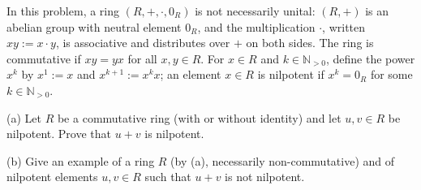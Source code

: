 \begin{problem}
    In this problem, a ring \( \left(R, +, \cdot, 0_R\right) \) is not necessarily unital: \( \left(R, +\right) \) is an abelian group with neutral element \( 0_R \), and the multiplication \( \cdot \), written \( xy := x \cdot y \), is associative and distributes over \( + \) on both sides. The ring is commutative if \( xy = yx \) for all \( x, y \in R \). For \( x \in R \) and \( k \in \mathbb{N}_{>0} \), define the power \( x^{k} \) by \( x^{1} := x \) and \( x^{k+1} := x^{k} x \); an element \( x \in R \) is nilpotent if \( x^{k} = 0_R \) for some \( k \in \mathbb{N}_{>0} \).

    (a) Let \( R \) be a commutative ring (with or without identity) and let \( u, v \in R \) be nilpotent. Prove that \( u + v \) is nilpotent.

    (b) Give an example of a ring \( R \) (by (a), necessarily non-commutative) and of nilpotent elements \( u, v \in R \) such that \( u + v \) is not nilpotent.
\end{problem}
